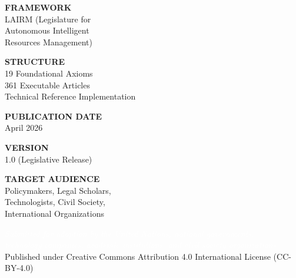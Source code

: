 \documentclass[12pt,a4paper,twoside,openright]{book}
\begin{document}
\begin{titlepage}
\begin{minipage}[t]{0.46\textwidth}
    \textbf{\textcolor{legislativeblue}{FRAMEWORK}}\\[5pt]
    LAIRM (Legislature for\\
    Autonomous Intelligent\\
    Resources Management)
    
    \vspace{1cm}
    
    \textbf{\textcolor{legislativeblue}{STRUCTURE}}\\[5pt]
    19 Foundational Axioms\\
    361 Executable Articles\\
    Technical Reference Implementation
\end{minipage}%
\hfill
\begin{minipage}[t]{0.46\textwidth}
    \raggedleft
    \sffamily\small
    \textbf{\textcolor{legislativeblue}{PUBLICATION DATE}}\\[5pt]
    April 2026
    
    \vspace{1cm}
    
    \textbf{\textcolor{legislativeblue}{VERSION}}\\[5pt]
    1.0 (Legislative Release)
    
    \vspace{1cm}
    
    \textbf{\textcolor{legislativeblue}{TARGET AUDIENCE}}\\[5pt]
    Policymakers, Legal Scholars,\\
    Technologists, Civil Society,\\
    International Organizations
\end{minipage}

\vspace{1.4cm}

\noindent\colorbox{legislativeblue}{%
    \parbox{\dimexpr\textwidth-2\fboxsep\relax}{%
        \vspace{10pt}
        \centering
        \textcolor{white}{\normalsize\sffamily\textit{Submitted for adoption by the United Nations, national governments,}}\\[3pt]
        \textcolor{white}{\normalsize\sffamily\textit{technology companies, academic institutions, and civil society organizations}}\\[4pt]
        \textcolor{accentgold}{\small\sffamily Published under Creative Commons Attribution 4.0 International License (CC-BY-4.0)}
        \vspace{10pt}
    }%
}

\end{titlepage}
\end{document}
